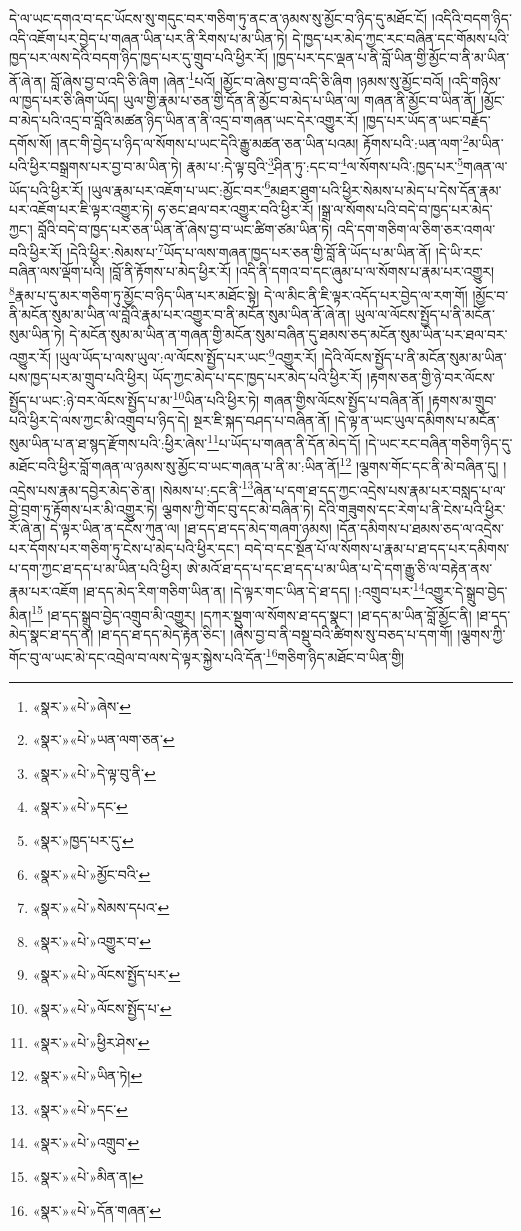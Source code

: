 དེ་ལ་ཡང་དགའ་བ་དང་ཡོངས་སུ་གདུང་བར་གཅིག་ཏུ་ནང་ན་ཉམས་སུ་མྱོང་བ་ཉིད་དུ་མཐོང་ངོ། །འདིའི་བདག་ཉིད་འདི་འཇོག་པར་བྱེད་པ་གཞན་ཡིན་པར་ནི་རིགས་པ་མ་ཡིན་ཏེ། དེ་ཁྱད་པར་མེད་ཀྱང་རང་བཞིན་དང་གོམས་པའི་ཁྱད་པར་ལས་དེའི་བདག་ཉིད་ཁྱད་པར་དུ་གྲུབ་པའི་ཕྱིར་རོ། །ཁྱད་པར་དང་ལྡན་པ་ནི་བློ་ཡིན་གྱི་མྱོང་བ་ནི་མ་ཡིན་ནོ་ཞེ་ན། བློ་ཞེས་བྱ་བ་འདི་ཅི་ཞིག །ཞེན་\footnote{«སྣར་»«པེ་»ཞེས་}པའོ། །མྱོང་བ་ཞེས་བྱ་བ་འདི་ཅི་ཞིག །ཉམས་སུ་མྱོང་བའོ། །འདི་གཉིས་ལ་ཁྱད་པར་ཅི་ཞིག་ཡོད། ཡུལ་གྱི་རྣམ་པ་ཅན་གྱི་དོན་ནི་མྱོང་བ་མེད་པ་ཡིན་ལ། གཞན་ནི་མྱོང་བ་ཡིན་ནོ། །མྱོང་བ་མེད་པའི་འདྲ་བ་བློའི་མཚན་ཉིད་ཡིན་ན་ནི་འདྲ་བ་གཞན་ཡང་དེར་འགྱུར་རོ། །ཁྱད་པར་ཡོད་ན་ཡང་བརྗོད་དགོས་སོ། །ནང་གི་བྱེད་པ་ཉིད་ལ་སོགས་པ་ཡང་དེའི་རྒྱུ་མཚན་ཅན་ཡིན་པའམ། རྟོགས་པའི་:ཡན་ལག་\footnote{«སྣར་»«པེ་»ཡན་ལག་ཅན་}མ་ཡིན་པའི་ཕྱིར་བསྒྲགས་པར་བྱ་བ་མ་ཡིན་ཏེ། རྣམ་པ་:དེ་ལྟ་བུའི་\footnote{«སྣར་»«པེ་»དེ་ལྟ་བུ་ནི་}ཤིན་ཏུ་:དང་བ་\footnote{«སྣར་»«པེ་»དང་}ལ་སོགས་པའི་:ཁྱད་པར་\footnote{«སྣར་»ཁྱད་པར་དུ་}གཞན་ལ་ཡོད་པའི་ཕྱིར་རོ། །ཡུལ་རྣམ་པར་འཇོག་པ་ཡང་:མྱོང་བར་\footnote{«སྣར་»«པེ་»མྱོང་བའི་}མཐར་ཐུག་པའི་ཕྱིར་སེམས་པ་མེད་པ་དེས་དོན་རྣམ་པར་འཇོག་པར་ཇི་ལྟར་འགྱུར་ཏེ། ཧ་ཅང་ཐལ་བར་འགྱུར་བའི་ཕྱིར་རོ། །སྒྲ་ལ་སོགས་པའི་བདེ་བ་ཁྱད་པར་མེད་ཀྱང་། བློའི་བདེ་བ་ཁྱད་པར་ཅན་ཡིན་ནོ་ཞེས་བྱ་བ་ཡང་ཚིག་ཙམ་ཡིན་ཏེ། འདི་དག་གཅིག་ལ་ཅིག་ཅར་འགལ་བའི་ཕྱིར་རོ། །དེའི་ཕྱིར་:སེམས་པ་\footnote{«སྣར་»«པེ་»སེམས་དཔའ་}ཡོད་པ་ལས་གཞན་ཁྱད་པར་ཅན་གྱི་བློ་ནི་ཡོད་པ་མ་ཡིན་ནོ། །དེ་ཡི་རང་བཞིན་ལས་ལྡོག་པའི། །བློ་ནི་རྟོགས་པ་མེད་ཕྱིར་རོ། །འདི་ནི་དགའ་བ་དང་ཞུམ་པ་ལ་སོགས་པ་རྣམ་པར་འགྱུར། \footnote{«སྣར་»«པེ་»འགྱུར་བ་}རྣམ་པ་དུ་མར་གཅིག་ཏུ་མྱོང་བ་ཉིད་ཡིན་པར་མཐོང་སྟེ། དེ་ལ་མིང་ནི་ཇི་ལྟར་འདོད་པར་བྱེད་ལ་རག་གོ། །མྱོང་བ་ནི་མངོན་སུམ་མ་ཡིན་ལ་བློའི་རྣམ་པར་འགྱུར་བ་ནི་མངོན་སུམ་ཡིན་ནོ་ཞེ་ན། ཡུལ་ལ་ལོངས་སྤྱོད་པ་ནི་མངོན་སུམ་ཡིན་ཏེ། དེ་མངོན་སུམ་མ་ཡིན་ན་གཞན་གྱི་མངོན་སུམ་བཞིན་དུ་ཐམས་ཅད་མངོན་སུམ་ཡིན་པར་ཐལ་བར་འགྱུར་རོ། །ཡུལ་ཡོད་པ་ལས་ཡུལ་:ལ་ལོངས་སྤྱོད་པར་ཡང་\footnote{«སྣར་»«པེ་»ལོངས་སྤྱོད་པར་}འགྱུར་རོ། །དེའི་ལོངས་སྤྱོད་པ་ནི་མངོན་སུམ་མ་ཡིན་པས་ཁྱད་པར་མ་གྲུབ་པའི་ཕྱིར། ཡོད་ཀྱང་མེད་པ་དང་ཁྱད་པར་མེད་པའི་ཕྱིར་རོ། །རྟགས་ཅན་གྱི་ཉེ་བར་ལོངས་སྤྱོད་པ་ཡང་:ཉེ་བར་ལོངས་སྤྱོད་པ་མ་\footnote{«སྣར་»«པེ་»ལོངས་སྤྱོད་པ་}ཡིན་པའི་ཕྱིར་ཏེ། གཞན་གྱིས་ལོངས་སྤྱོད་པ་བཞིན་ནོ། །རྟགས་མ་གྲུབ་པའི་ཕྱིར་དེ་ལས་ཀྱང་མི་འགྲུབ་པ་ཉིད་དེ། སྔར་ཇི་སྐད་བཤད་པ་བཞིན་ནོ། །དེ་ལྟ་ན་ཡང་ཡུལ་དམིགས་པ་མངོན་སུམ་ཡིན་པ་ན་ཐ་སྙད་རྫོགས་པའི་:ཕྱིར་ཞེས་\footnote{«སྣར་»«པེ་»ཕྱིར་ཤེས་}པ་ཡོད་པ་གཞན་ནི་དོན་མེད་དོ། །དེ་ཡང་རང་བཞིན་གཅིག་ཉིད་དུ་མཐོང་བའི་ཕྱིར་བློ་གཞན་ལ་ཉམས་སུ་མྱོང་བ་ཡང་གཞན་པ་ནི་མ་:ཡིན་ནོ།\footnote{«སྣར་»«པེ་»ཡིན་ཏེ།} །ལྕགས་གོང་དང་ནི་མེ་བཞིན་དུ། །འདྲེས་པས་རྣམ་དབྱེར་མེད་ཅེ་ན། །སེམས་པ་:དང་ནི་\footnote{«སྣར་»«པེ་»དང་}ཞེན་པ་དག་ཐ་དད་ཀྱང་འདྲེས་པས་རྣམ་པར་བསླད་པ་ལ་བྱེ་བྲག་ཏུ་རྟོགས་པར་མི་འགྱུར་ཏེ། ལྕགས་ཀྱི་གོང་བུ་དང་མེ་བཞིན་ཏེ། དེའི་གཟུགས་དང་རེག་པ་ནི་ངེས་པའི་ཕྱིར་རོ་ཞེ་ན། དེ་ལྟར་ཡིན་ན་དངོས་ཀུན་ལ། །ཐ་དད་ཐ་དད་མེད་གཞག་ཉམས། །དོན་དམིགས་པ་ཐམས་ཅད་ལ་འདྲེས་པར་དོགས་པར་གཅིག་ཏུ་ངེས་པ་མེད་པའི་ཕྱིར་དང་། བདེ་བ་དང་སྔོན་པོ་ལ་སོགས་པ་རྣམ་པ་ཐ་དད་པར་དམིགས་པ་དག་ཀྱང་ཐ་དད་པ་མ་ཡིན་པའི་ཕྱིར། ཨེ་མའོ་ཐ་དད་པ་དང་ཐ་དད་པ་མ་ཡིན་པ་དེ་དག་རྒྱུ་ཅི་ལ་བརྟེན་ནས་རྣམ་པར་འཇོག །ཐ་དད་མེད་རིག་གཅིག་ཡིན་ན། །དེ་ལྟར་གང་ཡིན་དེ་ཐ་དད། །:འགྲུབ་པར་\footnote{«སྣར་»«པེ་»འགྲུབ་}འགྱུར་དེ་སྒྲུབ་བྱེད་མིན།\footnote{«སྣར་»«པེ་»མིན་ན།} །ཐ་དད་སྒྲུབ་བྱེད་འགྲུབ་མི་འགྱུར། །དཀར་སྡུག་ལ་སོགས་ཐ་དད་སྣང་། །ཐ་དད་མ་ཡིན་བློ་མྱོང་ནི། །ཐ་དད་མེད་སྣང་ཐ་དད་ན། །ཐ་དད་ཐ་དད་མེད་རྟེན་ཅིང་། །ཞེས་བྱ་བ་ནི་བསྡུ་བའི་ཚིགས་སུ་བཅད་པ་དག་གོ། །ལྕགས་ཀྱི་གོང་བུ་ལ་ཡང་མེ་དང་འབྲེལ་བ་ལས་དེ་ལྟར་སྐྱེས་པའི་དོན་\footnote{«སྣར་»«པེ་»དོན་གཞན་}གཅིག་ཉིད་མཐོང་བ་ཡིན་གྱི། 